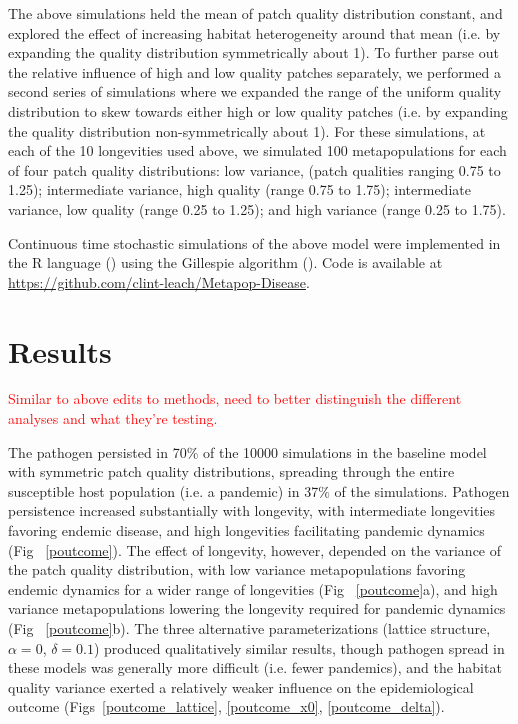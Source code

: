 \documentclass{svjour3}
\begin{document}
The above simulations held the mean of patch quality distribution constant, and explored the effect of increasing habitat heterogeneity around that mean (i.e. by expanding the quality distribution symmetrically about 1).  To further parse out the relative influence of high and low quality patches separately, we performed a second series of simulations where we expanded the range of the uniform quality distribution to skew towards either high or low quality patches (i.e. by expanding the quality distribution non-symmetrically about 1).  For these simulations, at each of the 10 longevities used above, we simulated 100 metapopulations for each of four patch quality distributions: low variance, (patch qualities ranging 0.75 to 1.25); intermediate variance, high quality (range 0.75 to 1.75); intermediate variance, low quality (range 0.25 to 1.25); and high variance (range 0.25 to 1.75). 

Continuous time stochastic simulations of the above model were implemented in the R language (\cite{R2014}) using the Gillespie algorithm (\cite{Gillespie1977}).  Code is available at \url{https://github.com/clint-leach/Metapop-Disease}.

\section{Results}
\label{results}

\textcolor{red}{Similar to above edits to methods, need to better distinguish the different analyses and what they're testing.}

The pathogen persisted in 70$\%$ of the 10000 simulations in the baseline model with symmetric patch quality distributions, spreading through the entire susceptible host population (i.e. a pandemic) in 37$\%$ of the simulations.  Pathogen persistence increased substantially with longevity, with intermediate longevities favoring endemic disease, and high longevities facilitating pandemic dynamics (Fig~ \ref{poutcome}).  The effect of longevity, however, depended on the variance of the patch quality distribution, with low variance metapopulations favoring endemic dynamics for a wider range of longevities (Fig~ \ref{poutcome}a), and high variance metapopulations lowering the longevity required for pandemic dynamics (Fig~ \ref{poutcome}b).  The three alternative parameterizations (lattice structure, $\alpha = 0$, $\delta = 0.1$) produced qualitatively similar results, though pathogen spread in these models was generally more difficult (i.e. fewer pandemics), and the habitat quality variance exerted a relatively weaker influence on the epidemiological outcome (Figs~\ref{poutcome_lattice}, \ref{poutcome_x0}, \ref{poutcome_delta}).
\end{document}
